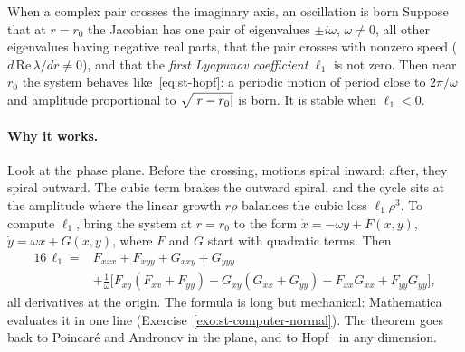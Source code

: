 \begin{gbox}{When a complex pair crosses the imaginary axis, an oscillation is born}\label{sec:st-hopfthm}
%
Suppose that at $r = r_0$ the Jacobian has one pair of eigenvalues
$\pm i\omega$, $\omega \neq 0$, all other eigenvalues having negative real parts,
that the pair crosses with nonzero speed ($d\,\mathrm{Re}\,\lambda/dr \neq 0$), and
that the \emph{first Lyapunov coefficient} $\ell_1$ is not zero. Then near
$r_0$ the system behaves like~\eqref{eq:st-hopf}: a periodic motion of period close
to $2\pi/\omega$ and amplitude proportional to $\sqrt{\lvert r - r_0\rvert}$ is born. It is
stable when $\ell_1 < 0$.
\end{gbox}

\paragraph{Why it works.}
Look at the phase plane. Before the crossing, motions spiral inward; after, they
spiral outward. The cubic term brakes the outward spiral, and the cycle sits at the
amplitude where the linear growth $r\rho$ balances the cubic loss $\ell_1\rho^3$.
To compute $\ell_1$, bring the system at $r = r_0$ to the form
$\dot x = -\omega y + F(x,y)$, $\dot y = \omega x + G(x,y)$, where $F$ and $G$ start
with quadratic terms. Then~\cite[Section~3.4]{st-guckenheimer1983}
\begin{equation}\label{eq:st-l1}
\begin{aligned}
  16\,\ell_1 = {}& F_{xxx} + F_{xyy} + G_{xxy} + G_{yyy} \\
  &+ \frac{1}{\omega}\bigl[F_{xy}(F_{xx} + F_{yy}) - G_{xy}(G_{xx} + G_{yy})
     - F_{xx}G_{xx} + F_{yy}G_{yy}\bigr],
\end{aligned}
\end{equation}
all derivatives at the origin. The formula is long but mechanical: Mathematica
evaluates it in one line (Exercise~\ref{exo:st-computer-normal}). The theorem goes
back to Poincaré and Andronov in the plane, and to Hopf~\cite{st-hopf1942} in any
dimension.

